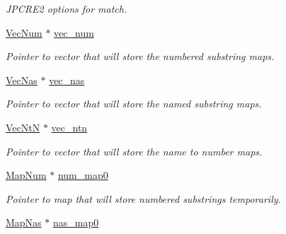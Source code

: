 \begin{DoxyCompactItemize}
\begin{DoxyCompactList}\small\item\em J\+P\+C\+R\+E2 options for match. \end{DoxyCompactList}\item 
\hyperlink{namespacejpcre2_ac1cf752c8fbb0be78020be3b80e77ce3}{Vec\+Num} $\ast$ \hyperlink{classjpcre2_1_1RegexMatch_a836705e0444568c78abaab4c8e351335}{vec\+\_\+num}\hypertarget{classjpcre2_1_1RegexMatch_a836705e0444568c78abaab4c8e351335}{}\label{classjpcre2_1_1RegexMatch_a836705e0444568c78abaab4c8e351335}

\begin{DoxyCompactList}\small\item\em Pointer to vector that will store the numbered substring maps. \end{DoxyCompactList}\item 
\hyperlink{namespacejpcre2_a2b121ae776ea5b2913839f418a7d856b}{Vec\+Nas} $\ast$ \hyperlink{classjpcre2_1_1RegexMatch_a812b57dc08fdc0caa93a1b508ef8242c}{vec\+\_\+nas}\hypertarget{classjpcre2_1_1RegexMatch_a812b57dc08fdc0caa93a1b508ef8242c}{}\label{classjpcre2_1_1RegexMatch_a812b57dc08fdc0caa93a1b508ef8242c}

\begin{DoxyCompactList}\small\item\em Pointer to vector that will store the named substring maps. \end{DoxyCompactList}\item 
\hyperlink{namespacejpcre2_a88a7aaf84cad627d34c8152e726168eb}{Vec\+NtN} $\ast$ \hyperlink{classjpcre2_1_1RegexMatch_a86ef413ab6d237972af858be26ff77f7}{vec\+\_\+ntn}\hypertarget{classjpcre2_1_1RegexMatch_a86ef413ab6d237972af858be26ff77f7}{}\label{classjpcre2_1_1RegexMatch_a86ef413ab6d237972af858be26ff77f7}

\begin{DoxyCompactList}\small\item\em Pointer to vector that will store the name to number maps. \end{DoxyCompactList}\item 
\hyperlink{namespacejpcre2_a947e37f0e4a1678157e7f1f855638e82}{Map\+Num} $\ast$ \hyperlink{classjpcre2_1_1RegexMatch_a94ad930ea8cb22873737fda344bae508}{num\+\_\+map0}\hypertarget{classjpcre2_1_1RegexMatch_a94ad930ea8cb22873737fda344bae508}{}\label{classjpcre2_1_1RegexMatch_a94ad930ea8cb22873737fda344bae508}

\begin{DoxyCompactList}\small\item\em Pointer to map that will store numbered substrings temporarily. \end{DoxyCompactList}\item 
\hyperlink{namespacejpcre2_a20bd901c9ca3c949806aa6b9e324f6cf}{Map\+Nas} $\ast$ \hyperlink{classjpcre2_1_1RegexMatch_a36749947847f266de03c3991ac88a694}{nas\+\_\+map0}\hypertarget{classjpcre2_1_1RegexMatch_a36749947847f266de03c3991ac88a694}{}\label{classjpcre2_1_1RegexMatch_a36749947847f266de03c3991ac88a694}


\end{DoxyCompactItemize}
